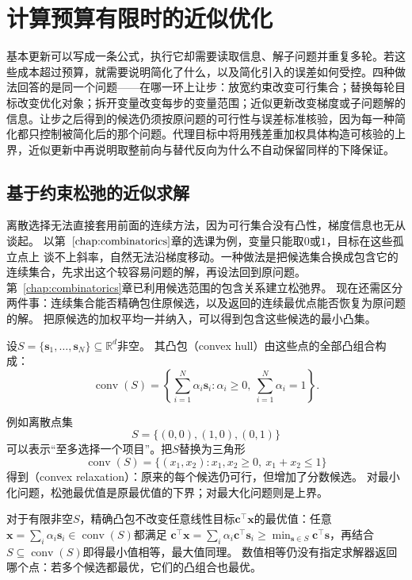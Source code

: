 \section{计算预算有限时的近似优化}
\label{sec:opt-approximate-optimization}

基本更新可以写成一条公式，执行它却需要读取信息、解子问题并重复多轮。若这些成本超过预算，就需要说明简化了什么，以及简化引入的误差如何受控。四种做法回答的是同一个问题——在哪一环上让步：放宽约束改变可行集合；替换每轮目标改变优化对象；拆开变量改变每步的变量范围；近似更新改变梯度或子问题解的信息。让步之后得到的候选仍须按原问题的可行性与误差标准核验，因为每一种简化都只控制被简化后的那个问题。代理目标中将用残差重加权具体构造可核验的上界，近似更新中再说明取整前向与替代反向为什么不自动保留同样的下降保证。

\subsection{基于约束松弛的近似求解}
\label{sec:opt-relaxations-certificates}

离散选择无法直接套用前面的连续方法，因为可行集合没有凸性，梯度信息也无从谈起。
以第~$\ref{chap:combinatorics}$章的选课为例，变量只能取$0$或$1$，目标在这些孤立点上
谈不上斜率，自然无法沿梯度移动。一种做法是把候选集合换成包含它的连续集合，先求出这个较容易问题的解，再设法回到原问题。
第~\ref{chap:combinatorics}章已利用候选范围的包含关系建立松弛界。
现在还需区分两件事：连续集合能否精确包住原候选，以及返回的连续最优点能否恢复为原问题的解。
把原候选的加权平均一并纳入，可以得到包含这些候选的最小凸集。

\begin{definition}[有限点集的凸包]
\label{def:opt-convex-hull}
设$S=\{\bm s_1,\ldots,\bm s_N\}\subseteq\mathbb R^d$非空。
其凸包（convex hull）由这些点的全部凸组合构成：
\[
  \operatorname{conv}(S)
  =\left\{\sum_{i=1}^N\alpha_i\bm s_i:
  \alpha_i\geq0,\ \sum_{i=1}^N\alpha_i=1\right\}.
\]
\end{definition}
例如离散点集
\[
  S=\{(0,0),(1,0),(0,1)\}
\]
可以表示“至多选择一个项目”。把$S$替换为三角形
\[
  \operatorname{conv}(S)
  =\{(x_1,x_2):x_1,x_2\geq0,\ x_1+x_2\leq1\}
\]
得到（convex relaxation）：原来的每个候选仍可行，但增加了分数候选。
对最小化问题，松弛最优值是原最优值的下界；对最大化问题则是上界。

对于有限非空$S$，精确凸包不改变任意线性目标$\bm{c}^{\top}\bm{x}$的最优值：任意
$\bm{x}=\sum_i\alpha_i\bm{s}_i\in\operatorname{conv}(S)$都满足
$\bm{c}^{\top}\bm{x}=\sum_i\alpha_i\bm{c}^{\top}\bm{s}_i
\geq\min_{\bm{s}\in S}\bm{c}^{\top}\bm{s}$，再结合
$S\subseteq\operatorname{conv}(S)$即得最小值相等，最大值同理。
数值相等仍没有指定求解器返回哪个点：若多个候选都最优，它们的凸组合也最优。

